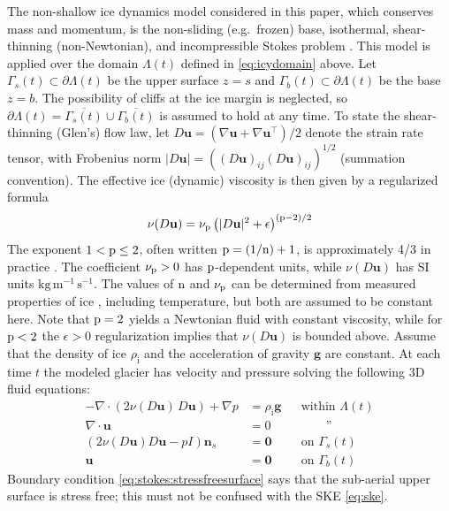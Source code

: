 \documentclass[hidelinks,onefignum,onetabnum,final]{siamart220329}  %
\newcommand{\eps}{\epsilon}
\newcommand{\grad}{\nabla}
\newcommand{\bg}{\mathbf{g}}
\newcommand{\bn}{\mathbf{n}}
\newcommand{\bu}{\mathbf{u}}
\newcommand{\bzero}{\bm{0}}
\newcommand{\nn}{{\text{\textnormal{n}}}}
\newcommand{\pp}{{\text{\textnormal{p}}}}
\newcommand{\rhoi}{\rho_{\text{i}}}
\begin{document}
The non-shallow ice dynamics model considered in this paper, which conserves mass and momentum, is the non-sliding (e.g.~frozen) base, isothermal, shear-thinning (non-Newtonian), and incompressible Stokes problem \cite{GreveBlatter2009,JouvetRappaz2011,SchoofHewitt2013}.  This model is applied over the domain $\Lambda(t)$ defined in \eqref{eq:icydomain} above.  Let $\Gamma_s(t) \subset \partial \Lambda(t)$ be the upper surface $z=s$ and $\Gamma_b(t) \subset \partial \Lambda(t)$ be the base $z=b$.  The possibility of cliffs at the ice margin is neglected, so $\partial \Lambda(t) = \overline{\Gamma_s(t)} \cup \overline{\Gamma_b(t)}$ is assumed to hold at any time.  To state the shear-thinning (Glen's) flow law, let $D\bu=(\grad \bu + \grad \bu^{\top})/2$ denote the strain rate tensor, with Frobenius norm $|D\bu| = \left((D\bu)_{ij} (D\bu)_{ij}\right)^{1/2}$ (summation convention).  The effective ice (dynamic) viscosity \cite{GreveBlatter2009} is then given by a regularized formula
\begin{equation}
\nu(D\bu) = \nu_\pp \left(|D\bu|^2 + \eps\right)^{(\pp-2)/2} \label{eq:glen}
\end{equation}
The exponent $1 < \pp \le 2$, often written $\pp=(1/\nn)+1$, is approximately 4/3 in practice \cite{GreveBlatter2009}.  The coefficient $\nu_\pp>0$ has $\pp$-dependent units, while $\nu(D\bu)$ has SI units $\text{kg}\,\text{m}^{-1}\,\text{s}^{-1}$.  The values of $\nn$ and $\nu_\pp$ can be determined from measured properties of ice \cite{GoldsbyKohlstedt2001,GreveBlatter2009}, including temperature, but both are assumed to be constant here.  Note that $\pp=2$ yields a Newtonian fluid with constant viscosity, while for $\pp < 2$ the $\eps>0$ regularization implies that $\nu(D\bu)$ is bounded above.  Assume that the density of ice $\rhoi$ and the acceleration of gravity $\bg$ are constant.  At each time $t$ the modeled glacier has velocity and pressure solving the following 3D fluid equations:
\begin{subequations}
\label{eq:stokes}
\begin{align}
- \nabla \cdot \left(2 \nu(D\bu)\, D\bu\right) + \nabla p &= \rhoi \bg && \text{within $\Lambda(t)$} \\
\nabla \cdot \bu &= 0 && \qquad \text{''} \label{eq:stokes:incomp} \\
\left(2 \nu(D\bu) D\bu - pI\right) \bn_s &= \bzero && \text{on $\Gamma_s(t)$}\label{eq:stokes:stressfreesurface} \\
\bu  &= \bzero && \text{on $\Gamma_b(t)$} \label{eq:stokes:noslide}
\end{align}
\end{subequations}
Boundary condition \eqref{eq:stokes:stressfreesurface} says that the sub-aerial upper surface is stress free; this must not be confused with the SKE \eqref{eq:ske}.
\end{document}

